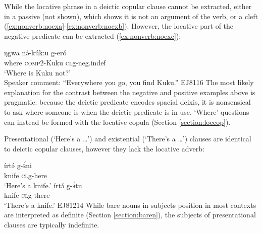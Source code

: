 While the locative phrase in a deictic copular clause cannot be extracted, either in a passive (not shown), which shows it is not an argument of the verb, or a cleft (\ref{ex:nonverb:noexa}-\ref{ex:nonverb:noexb}). However, the locative part of the negative predicate can be extracted (\ref{ex:nonverb:noexc}):

\ea 
		 \label{ex:nonverb:noexa}
			\label{ex:nonverb:noexa}
	\ex  \gll	ŋgwa		nə́-kúk:u	 	g-eró	 \\
		where		\textsc{comp2}-Kuku	\textsc{cl}g-neg.indef\\
		\glt `Where is Kuku not?’\\
	Speaker comment: ``Everywhere you go, you find Kuku.'' \hfill EJ8116
 \label{ex:nonverb:noexc} \z  
\z 
The most likely explanation for the contrast between the negative and positive examples above is pragmatic: because the deictic predicate encodes spacial deixis, it is nonsensical to ask where someone is when the deictic predicate is in use. `Where' questions can instead be formed with the locative copula (Section \ref{section:loccop}).
	

Presentational (`Here's a \ldots') and existential (`There's a \ldots') clauses are identical to deictic copular clauses, however they lack the locative adverb:

\ea 
	\ea \gll	írtə́	g-ɜ́ni\\
				knife 	\textsc{cl}g-here\\
		\glt 	‘Here’s a knife.’ 		
	\ex \gll 	írtə́	g-ɜ́tu\\
				knife 	\textsc{cl}g-there\\
		\glt 	‘There’s a knife.’	\hfill EJ81214	
\z \z 
While bare nouns in subjects position in most contexts are interpreted as definite (Section \ref{section:baren}), the subjects of presentational clauses are typically indefinite. 


